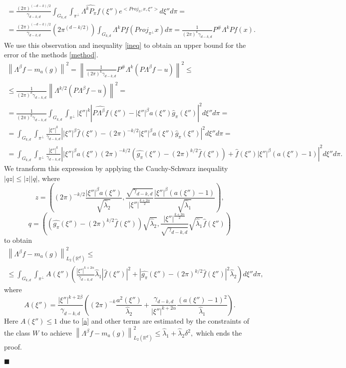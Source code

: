 \documentclass[12pt]{iopart}
\newenvironment{proof}
{\par\noindent{\bf Proof}}
{\hfill$\scriptstyle\blacksquare$}
\begin{document}
\begin{proof}
\begin{multline*}
		= \frac{(2\pi)^{(-d-k)/2}}{\gamma_{d-k,d}}\int_{G_{k,d}}\int_{\pi^\perp}\widehat{\Lambda^kP_\pi f}(\xi'')e^{<Proj_{\pi^\perp}x,\xi''>}d\xi''d\pi = \\
		= \frac{(2\pi)^{(-d-k)/2}}{\gamma_{d-k,d}}(2\pi^{(d-k/2)})\int_{G_{k,d}}\Lambda^kP f(Proj_{\pi^\perp}x)d\pi = \frac{1}{(2\pi)^k\gamma_{d-k,d}}P^\#\Lambda^kPf(x).
		\end{multline*}
		We use this observation and inequality \eqref{ineq} to obtain an upper bound for the error of the methods \eqref{method}.
		\begin{multline*}
		\left\|\Lambda^\beta f-m_a(g)\right\|^2=\left\|\frac{1}{(2\pi)^k\gamma_{d-k,d}}P^\#\Lambda^k(P\Lambda^\beta f-u)\right\|^2\leqslant\\
		\leqslant\frac{1}{(2\pi)^k\gamma_{d-k,d}}\left\|\Lambda^{k/2}(P\Lambda^\beta f-u)\right\|^2=\\
		=\frac{1}{(2\pi)^k\gamma_{d-k,d}}\int_{G_{k,d}}\int_{\pi^\perp}|\xi''|^k\left|\widehat{P\Lambda^\beta f}(\xi'')-|\xi''|^\beta a(\xi'')\widehat g_\pi(\xi'')\right|^2d\xi'' d\pi=\\
		=\int_{G_{k,d}}\int_{\pi^\perp}\frac{|\xi''|^k}{\gamma_{d-k,d}}\left||\xi''|^\beta\widehat{f}(\xi'')-(2\pi)^{-k/2}|\xi''|^\beta a(\xi'')\widehat g_\pi(\xi'')\right|^2d\xi'' d\pi=\\
		=\int_{G_{k,d}}\int_{\pi^\perp}\frac{|\xi''|^k}{\gamma_{d-k,d}}\left||\xi''|^\beta a(\xi'')(2\pi)^{-k/2}\left(\widehat{g_\pi }(\xi'')-(2\pi)^{k/2}\widehat f(\xi'' )\right)+\widehat f(\xi'')|\xi''|^\beta\left(a(\xi'')-1\right)\right|^2d\xi''d\pi .
		\end{multline*}
		We transform this expression by applying the Cauchy-Schwarz inequality $|qz|\leqslant |z||q|$, where
		\[
		z=\left((2\pi)^{-k/2}\frac{|\xi''|^\beta a(\xi'')}{\sqrt{\widehat\lambda_2}},\frac{\sqrt{\gamma_{d-k,d}}}{|\xi''|^{\frac{k+2\alpha}{2}}}\frac{|\xi''|^\beta(a(\xi'')-1)}{\sqrt{\widehat\lambda_1}}\right),
		\]
		\[
		q=\left(\left(\widehat{g_\pi }(\xi'')-(2\pi)^{k/2}\widehat
		f(\xi'' )\right)\sqrt{\widehat\lambda_2},\frac{|\xi''|^{\frac{k+2\alpha}{2}}}{\sqrt{\gamma_{d-k,d}}}\sqrt{\widehat\lambda_1}\widehat f(\xi'' )\right)
		\]
		to obtain
		\begin{multline*}  
		\left\|\Lambda^\beta f-m_a(g)\right\|^2_{L_2(\mathbb R^d)}\leqslant  \\
		\leqslant \int_{G_{k,d}}\int_{\pi^\perp}
		A(\xi'')\left(\frac{|\xi''|^{k+2\alpha}}{\gamma_{d-k,d}}\widehat\lambda_1|\widehat f(\xi'')|^2+\left|\widehat{g_\pi}(\xi'')-(2\pi)^{k/2}\widehat f(\xi'')\right|^2\widehat\lambda_2\right)d\xi''d\pi,
		\end{multline*}
		where
		\[
		A(\xi'')=\frac{|\xi''|^{k+2\beta}}{\gamma_{d-k,d}}\left((2\pi)^{-k}\frac{a^2(\xi'')}{\widehat\lambda_2}+\frac{\gamma_{d-k,d}}{|\xi''|^{k+2\alpha}}\frac{(a(\xi'')-1)^2}{\widehat\lambda_1}\right).
		\]
		Here $A(\xi'')\leqslant 1$ due to \eqref{a} and other terms are estimated by the constraints of the class $W$ to achieve $\left\|\Lambda^\beta f-m_a(g)\right\|^2_{L_2(\mathbb R^d)}\leqslant
		\widehat\lambda_1+\widehat\lambda_2\delta^2,$ which ends the proof.
		
	\end{proof}
	
\end{document}
